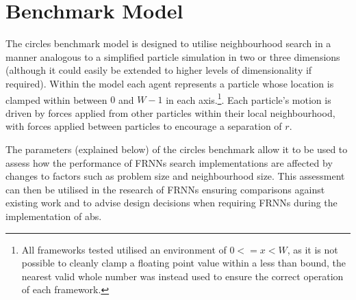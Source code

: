 \section{Benchmark Model\label{sec:benchmark-model}}
  The circles benchmark model is designed to utilise neighbourhood search in a manner analogous to a simplified particle simulation in two or three dimensions (although it could easily be extended to higher levels of dimensionality if required). Within the model each agent represents a particle whose location is clamped within between $0$ and $W-1$ in each axis.\footnote{All frameworks tested utilised an environment of $0<=x<W$, as it is not possible to cleanly clamp a floating point value within a less than bound, the nearest valid whole number was instead used to ensure the correct operation of each framework.}. Each particle's motion is driven by forces applied from other particles within their local neighbourhood, with forces applied between particles to encourage a separation of $r$.
   
  The parameters (explained below) of the circles benchmark allow it to be used to assess how the performance of FRNNs search implementations are affected by changes to factors such as problem size and neighbourhood size. This assessment can then be utilised in the research of FRNNs ensuring comparisons against existing work and to advise design decisions when requiring FRNNs during the implementation of \gls{abs}.
  
